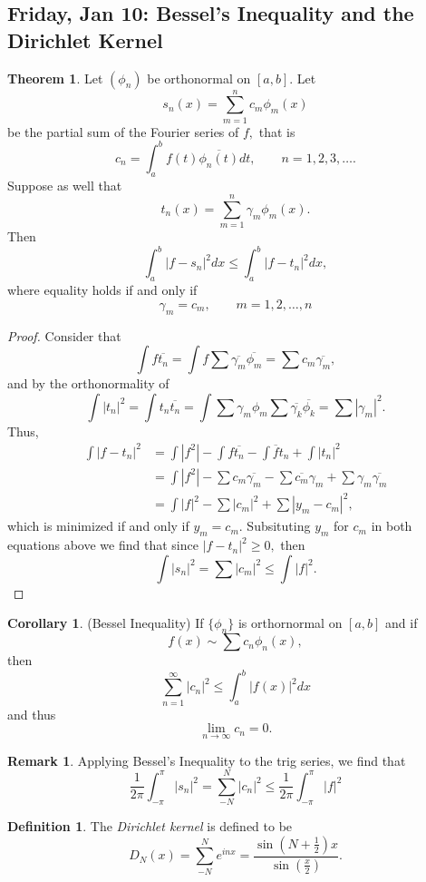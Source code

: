 \documentclass[10pt, oneside]{article}
\theoremstyle{definition}
\newtheorem{thm}{Theorem}
\newtheorem{defn}{Definition}
\newtheorem{rem}{Remark}
\newtheorem{cor}{Corollary}
\begin{document}
 \newpage
 \subsection{Friday, Jan 10: Bessel's Inequality and the Dirichlet Kernel}
 \begin{thm}
     Let $(\phi_n)$ be orthonormal on $[a,b].$ Let
     \[s_n(x) = \sum_{m=1}^n c_m \phi_m(x)\] be the partial sum of the Fourier series of $f,$ that is 
     \[c_n = \int_a^b f(t) \overline{\phi_n(t)}dt, \qquad n = 1,2,3,\dots.\]
     Suppose as well that
     \[t_n(x) = \sum_{m=1}^n \gamma_m\phi_m(x).\] Then 
     \[\int_a^b |f-s_n|^2 dx \leq \int_a^b |f-t_n|^2 dx,\] where equality holds if and only if
     \[\gamma_m = c_m, \qquad m= 1,2,\dots, n\]
 \end{thm}
 \begin{proof}
     Consider that 
     \[\int f \overline{t_n} = \int f \sum \overline{\gamma_m}\overline{\phi_m} = \sum c_m \overline{\gamma_m},\] and by the orthonormality of 
     \[\int |t_n|^2 = \int t_n \overline{t_n} = \int \sum \gamma_m \phi_m \sum \overline{\gamma_k}\overline{\phi_k} = \sum |\gamma_m|^2.\] Thus,
     \begin{align*}
         \int |f - t_n|^2 &= \int |f^2| - \int f\overline{t_n} - \int \overline{f}t_n + \int |t_n|^2\\
         &= \int |f^2| - \sum c_m \overline{\gamma_m} - \sum \overline{c_m} \gamma_m + \sum \gamma_m \overline{\gamma_m}\\
         &= \int |f|^2 - \sum |c_m|^2 + \sum |y_m - c_m|^2,
     \end{align*} which is minimized if and only if $y_m = c_m.$ Subsituting $y_m$ for $c_m$ in both equations above we find that since $|f-t_n|^2 \geq 0,$ then 
     \[\int |s_n|^2 = \sum |c_m|^2 \leq \int |f|^2.\]
 \end{proof}
 \begin{cor} (Bessel Inequality)
     If $\{\phi_n\}$ is orthornormal on $[a,b]$ and if 
     \[f(x)\sim \sum c_n \phi_n(x),\] then 
     \[\sum_{n=1}^\infty |c_n|^2 \leq \int_a^b |f(x)|^2 dx\] and thus
     \[\lim_{n\to \infty} c_n = 0.\]
 \end{cor}
 \begin{rem}
     Applying Bessel's Inequality to the trig series, we find that 
     \[\frac{1}{2\pi}\int_{-\pi}^\pi |s_n|^2 = \sum_{-N}^N |c_n|^2 \leq \frac{1}{2\pi}\int_{-\pi}^\pi |f|^2\]
 \end{rem}
 \begin{defn}
     The \textit{Dirichlet kernel} is defined to be 
     \[D_N(x) = \sum_{-N}^N e^{inx} = \frac{\sin(N + \frac{1}{2})x}{\sin(\frac{x}{2})}.\]
 \end{defn}
\end{document}
